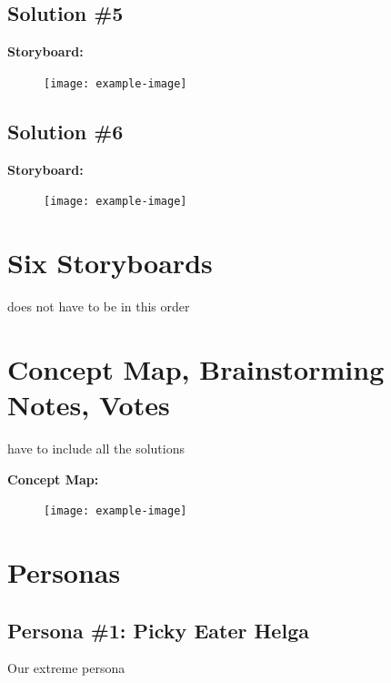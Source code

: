 \documentclass[a4paper,10pt,oneside]{scrreprt}
\begin{document}
		\subsection{Solution \#5}

			\noindent \textbf{Storyboard:}\\

			\begin{figure}[H]
				\centering
				\texttt{[image: example-image]}
			\end{figure}

		\subsection{Solution \#6}

			\noindent \textbf{Storyboard:}\\

			\begin{figure}[H]
				\centering
				\texttt{[image: example-image]}
			\end{figure}

		\bigskip

	\section{Six Storyboards}
		does not have to be in this order

	\section{Concept Map, Brainstorming Notes, Votes}
		have to include all the solutions

			\noindent \textbf{Concept Map:}\\

			\begin{figure}[H]
				\centering
				\texttt{[image: example-image]}
			\end{figure}


	\section{Personas}

		\subsection{Persona \#1: Picky Eater Helga}

		Our extreme persona
\end{document}
